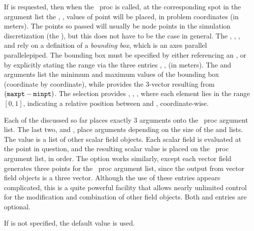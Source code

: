 \begin{description}
   If  is requested, then when the \Tcl\ proc is called, at
   the corresponding spot in the argument list the , ,
    values of point will be placed, in problem coordinates (in
   meters).  The points so passed will usually be node points in the
   simulation discretization (the ), but
   this does not have to be the case in general.  The ,
   , , and  rely on a definition of a
   \textit{bounding box}, which is an axes parallel parallelepiped.  The
   bounding box must be specified by either referencing an
   , or by explicitly stating the range via the three
   entries , ,  (in
   meters).  The  and  arguments list the minimum
   and maximum values of the bounding box (coordinate by coordinate),
   while  provides the 3-vector resulting from $(\texttt{maxpt} -
   \texttt{minpt})$.  The  selection provides ,
   , , where each element lies in the range
   $[0,1]$, indicating a relative position between  and
   , coordinate-wise.

   Each of the  discussed so far places exactly 3
   arguments onto the \Tcl\ proc argument list.  The last two,
    and , place arguments depending on the size
   of the  and  lists.
   The  value is a list of other scalar field
   objects.  Each scalar field is evaluated at the point in question,
   and the resulting scalar value is placed on the \Tcl\ proc argument
   list, in order.  The  option works similarly,
   except each vector field generates three points for the \Tcl\ proc
   argument list, since the output from vector field objects is a three
   vector.  Although the use of these entries appears complicated, this
   is a quite powerful facility that allows nearly unlimited control for
   the modification and combination of other field objects.  Both
    and  entries are optional.

   If  is not specified, the default value 
   is used.


\end{description}
